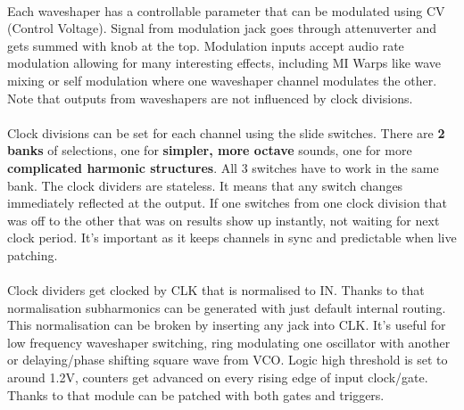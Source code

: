 \documentclass[a4paper,14pt]{extarticle}
\newlength\myboxwidth
\begin{document}
\vspace{0.5cm}
\\
Each waveshaper has a controllable parameter that can be modulated using CV (Control Voltage). Signal from modulation jack goes through attenuverter and gets summed with knob at the top. Modulation inputs accept audio rate modulation allowing for many interesting effects, including MI Warps like wave mixing or self modulation where one waveshaper channel modulates the other.
\\
Note that outputs from waveshapers are not influenced by clock divisions.
\vspace{0.5cm}
\\
\vspace{0.5cm}
\\
Clock divisions can be set for each channel using the \textcolor{division_color}{slide switches}. There are \textbf{2 banks} of selections, one for \textbf{simpler, more octave} sounds, one for more \textbf{complicated harmonic structures}. All 3 switches have to work in the same bank. The clock dividers are stateless. It means that any switch changes immediately reflected at the output. If one switches from one clock division that was off to the other that was on results show up instantly, not waiting for next clock period. It's important as it keeps channels in sync and predictable when live patching.
\vspace{0.5cm}
\\
\vspace{0.5cm}
\\
\textcolor{division_color}{Clock dividers} get clocked by CLK that is normalised to IN. Thanks to that normalisation subharmonics can be generated with just default internal routing. This normalisation can be broken by inserting any jack into CLK. It's useful for low frequency waveshaper switching, ring modulating one oscillator with another or delaying/phase shifting square wave from VCO. Logic high threshold is set to around 1.2V, counters get advanced on every rising edge of input clock/gate. Thanks to that module can be patched with both gates and triggers.
\end{document}
